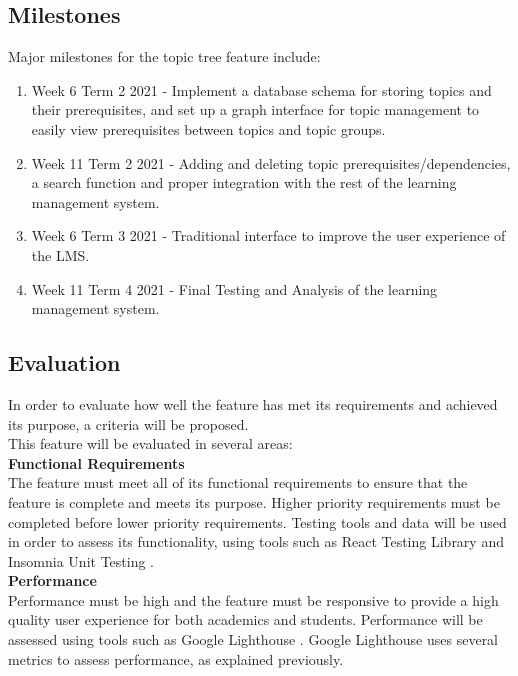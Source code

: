 \newpage
\subsection{Milestones}
Major milestones for the topic tree feature include: \\
\begin{enumerate}
\item Week 6 Term 2 2021 - Implement a database schema for storing topics and their prerequisites, and set up a graph interface for topic management to easily view prerequisites between topics and topic groups.
\item Week 11 Term 2 2021 - Adding and deleting topic prerequisites/dependencies, a search function and proper integration with the rest of the learning management system.
\item Week 6 Term 3 2021 - Traditional interface to improve the user experience of the LMS.
\item Week 11 Term 4 2021 - Final Testing and Analysis of the learning management system.
\end{enumerate}

\subsection{Evaluation}
In order to evaluate how well the feature has met its requirements and achieved its purpose, a criteria will be proposed. \\

This feature will be evaluated in several areas:\\
\textbf{Functional Requirements} \\
The feature must meet all of its functional requirements to ensure that the feature is complete and meets its purpose. Higher priority requirements must be completed before lower priority requirements. Testing tools and data will be used in order to assess its functionality, using tools such as React Testing Library \cite{reactTestingLibrary} and Insomnia Unit Testing \cite{insomniaTesting}.\\

\textbf{Performance} \\
Performance must be high and the feature must be responsive to provide a high quality user experience for both academics and students. Performance will be assessed using tools such as Google Lighthouse \cite{googleLighthouse}. Google Lighthouse uses several metrics to assess performance, as explained previously. \\

